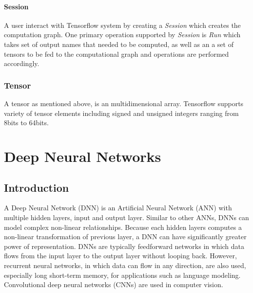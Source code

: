 \documentclass[12pt, a4paper]{report}
\begin{document}
 \subsubsection{Session}\label{session}
A user interact with Tensorflow system by creating a \textit{Session} which creates the computation graph. One primary operation supported by \textit{Session} is \textit{Run} which takes set of output names that needed to be computed, as well as an a set of tensors to be fed to the computational graph and operations are performed accordingly.

\subsection{Tensor}\label{tensor}

A tensor as mentioned above, is an multidimensional array. Tensorflow supports variety of tensor elements including signed and unsigned integers ranging from 8bits to 64bits.

\clearpage

\chapter{Deep Neural Networks}\label{ref:DNN} 

\section{Introduction}\label{sec:intro_dnn}

A Deep Neural Network (DNN) is an Artificial Neural Network (ANN) with multiple hidden layers, input and output layer. Similar to other ANNs, DNNs can model complex non-linear relationships. Because each hidden layers computes a non-linear transformation of previous layer, a DNN can have significantly greater power of representation. DNNs are typically feedforward networks in which data flows from the input layer to the output layer without looping back. However, recurrent neural networks, in which data can flow in any direction, are also used, especially long short-term memory, for applications such as language modeling. Convolutional deep neural networks (CNNs) are used in computer vision. \\ \par
\end{document}
